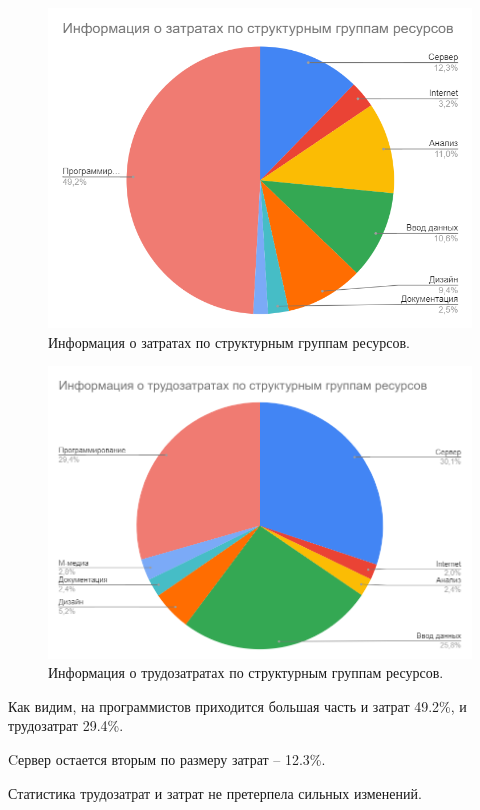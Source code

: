 \documentclass[a4paper,14pt]{extreport} %
\begin{document}
\begin{enumerate}
\begin{figure}[H]
  \centering
  \caption{Информация о затратах по структурным группам ресурсов. }
  \includegraphics[scale=1]{d1}
\end{figure}

\begin{figure}[H]
  \centering
  \caption{Информация о трудозатратах по структурным группам ресурсов. }
  \includegraphics[scale=1]{d2}
\end{figure}

Как видим, на программистов приходится большая часть и затрат 49.2\%, и трудозатрат 29.4\%.

Cервер остается вторым по размеру затрат -- 12.3\%.

Статистика трудозатрат и затрат не претерпела сильных изменений.


\end{enumerate}
\end{document}
